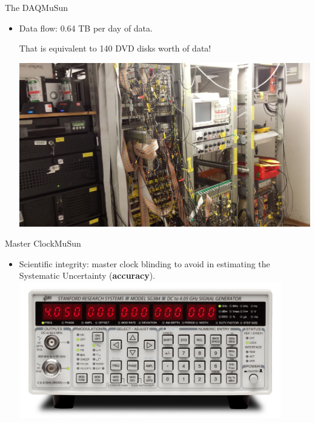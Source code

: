 \documentclass{beamer}
\begin{document}
\begin{frame}{The DAQ}{MuSun}
  \begin{itemize}
  \item {
   Data flow: 0.64 TB per day of data. 
   
   That is equivalent to 140 DVD disks worth of data! 
  }
  \includegraphics[height=0.6\textheight]{figures/daq.jpg} \\
  \end{itemize}
\end{frame}


\begin{frame}{Master Clock}{MuSun}
  \begin{itemize}
  \item {
  Scientific integrity: master clock blinding to avoid  in estimating the Systematic Uncertainty (\textbf{accuracy}).
  }
  \includegraphics[height=0.4\textheight, width=0.9\textwidth]{figures/signal.jpg} \\
  \end{itemize}
  \let\thefootnote\relax{}
\end{frame}
\end{document}
